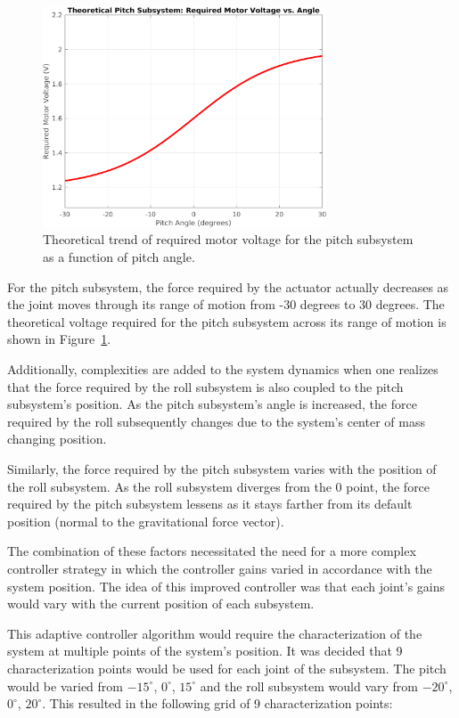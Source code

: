 \begin{figure}[H]
    \centering
\includegraphics[width=0.75\textwidth]{figures/Pitch_Subsystem_Theoretical_Trend.png}
    \caption{Theoretical trend of required motor voltage for the pitch subsystem as a function of pitch angle.}
    \label{fig:pitch_voltage_trend}
\end{figure}

For the pitch subsystem, the force required by the actuator actually decreases as the joint moves through its range of motion from -30 degrees to 30 degrees. The theoretical voltage required for the pitch subsystem across its range of motion is shown in Figure~\ref{fig:pitch_voltage_trend}.


Additionally, complexities are added to the system dynamics when one realizes that the force required by the roll subsystem is also coupled to the pitch subsystem's position. As the pitch subsystem's angle is increased, the force required by the roll subsequently changes due to the system's center of mass changing position.

Similarly, the force required by the pitch subsystem varies with the position of the roll subsystem. As the roll subsystem diverges from the 0 point, the force required by the pitch subsystem lessens as it stays farther from its default position (normal to the gravitational force vector).

The combination of these factors necessitated the need for a more complex controller strategy in which the controller gains varied in accordance with the system position. The idea of this improved controller was that each joint's gains would vary with the current position of each subsystem.

This adaptive controller algorithm would require the characterization of the system at multiple points of the system's position. It was decided that 9 characterization points would be used for each joint of the subsystem. The pitch would be varied from $-15^\circ$, $0^\circ$, $15^\circ$ and the roll subsystem would vary from $-20^\circ$, $0^\circ$, $20^\circ$. This resulted in the following grid of 9 characterization points:

